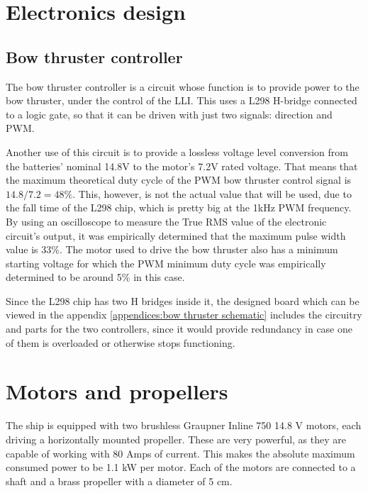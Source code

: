 \section{Electronics design}

	\subsection{Bow thruster controller}
	\label{subsec:bow thruster controller}
	
	The bow thruster controller is a circuit whose function is to provide power to the bow thruster, under the control of the \ac{LLI}. This uses a L298 H-bridge connected to a logic gate, so that it can be driven with just two signals: direction and \ac{PWM}.
	
	Another use of this circuit is to provide a lossless voltage level conversion from the batteries' nominal 14.8V to the motor's 7.2V rated voltage. That means that the maximum theoretical duty cycle of the PWM bow thruster control signal is $ 14.8 / 7.2 = 48 \% $. This, however, is not the actual value that will be used, due to the fall time of the L298 chip, which is pretty big at the 1kHz PWM frequency. By using an oscilloscope to measure the True RMS value of the electronic circuit's output, it was empirically determined that the maximum pulse width value is 33\%. 
	The motor used to drive the bow thruster also has a minimum starting voltage for which the PWM minimum duty cycle was empirically determined to be around 5\% in this case.
	
	Since the L298 chip has two H bridges inside it, the designed board which can be viewed in the appendix \vref{appendices:bow thruster schematic} includes the circuitry and parts for the two controllers, since it would provide redundancy in case one of them is overloaded or otherwise stops functioning.
	
\section{Motors and propellers}

The ship is equipped with two brushless Graupner Inline 750 14.8 V motors, each driving a horizontally mounted propeller. These are very powerful, as they are capable of working with 80 Amps of current. This makes the absolute maximum consumed power to be 1.1 kW per motor. Each of the motors are connected to a shaft and a brass propeller with a diameter of 5 cm.
